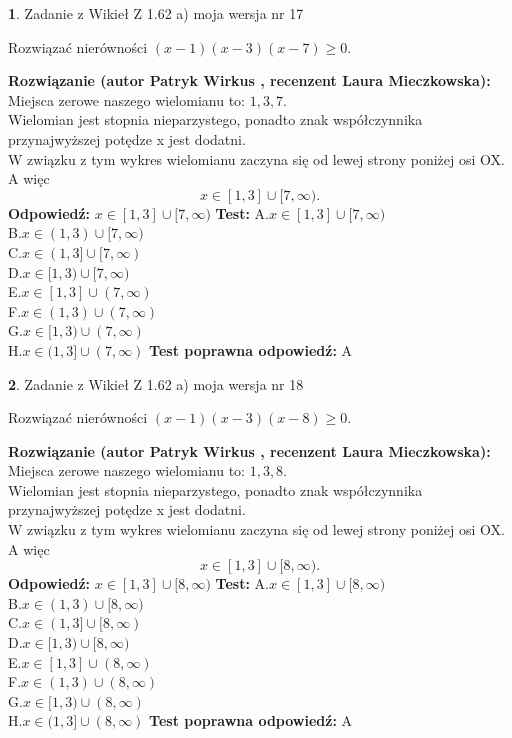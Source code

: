 \documentclass[12pt, a4paper]{article}
\theoremstyle{definition} %
\newtheorem{zad}{}
\newcommand{\zadStart}[1]{\begin{zad}#1\newline}
\newcommand{\zadStop}{\end{zad}}
\newcommand{\rozwStart}[2]{\noindent \textbf{Rozwiązanie (autor #1 , recenzent #2): }\newline}
\newcommand{\rozwStop}{\newline}
\newcommand{\odpStart}{\noindent \textbf{Odpowiedź:}\newline}
\newcommand{\odpStop}{\newline}
\newcommand{\testStart}{\noindent \textbf{Test:}\newline}
\newcommand{\testStop}{\newline}
\newcommand{\kluczStart}{\noindent \textbf{Test poprawna odpowiedź:}\newline}
\newcommand{\kluczStop}{\newline}
\begin{document}
\zadStart{Zadanie z Wikieł Z 1.62 a) moja wersja nr 17}

Rozwiązać nierówności $(x-1)(x-3)(x-7)\ge0$.
\zadStop
\rozwStart{Patryk Wirkus}{Laura Mieczkowska}
Miejsca zerowe naszego wielomianu to: $1, 3, 7$.\\
Wielomian jest stopnia nieparzystego, ponadto znak współczynnika przy\linebreak najwyższej potędze x jest dodatni.\\ W związku z tym wykres wielomianu zaczyna się od lewej strony poniżej osi OX. A więc $$x \in [1,3] \cup [7,\infty).$$
\rozwStop
\odpStart
$x \in [1,3] \cup [7,\infty)$
\odpStop
\testStart
A.$x \in [1,3] \cup [7,\infty)$\\
B.$x \in (1,3) \cup [7,\infty)$\\
C.$x \in (1,3] \cup [7,\infty)$\\
D.$x \in [1,3) \cup [7,\infty)$\\
E.$x \in [1,3] \cup (7,\infty)$\\
F.$x \in (1,3) \cup (7,\infty)$\\
G.$x \in [1,3) \cup (7,\infty)$\\
H.$x \in (1,3] \cup (7,\infty)$
\testStop
\kluczStart
A
\kluczStop



\zadStart{Zadanie z Wikieł Z 1.62 a) moja wersja nr 18}

Rozwiązać nierówności $(x-1)(x-3)(x-8)\ge0$.
\zadStop
\rozwStart{Patryk Wirkus}{Laura Mieczkowska}
Miejsca zerowe naszego wielomianu to: $1, 3, 8$.\\
Wielomian jest stopnia nieparzystego, ponadto znak współczynnika przy\linebreak najwyższej potędze x jest dodatni.\\ W związku z tym wykres wielomianu zaczyna się od lewej strony poniżej osi OX. A więc $$x \in [1,3] \cup [8,\infty).$$
\rozwStop
\odpStart
$x \in [1,3] \cup [8,\infty)$
\odpStop
\testStart
A.$x \in [1,3] \cup [8,\infty)$\\
B.$x \in (1,3) \cup [8,\infty)$\\
C.$x \in (1,3] \cup [8,\infty)$\\
D.$x \in [1,3) \cup [8,\infty)$\\
E.$x \in [1,3] \cup (8,\infty)$\\
F.$x \in (1,3) \cup (8,\infty)$\\
G.$x \in [1,3) \cup (8,\infty)$\\
H.$x \in (1,3] \cup (8,\infty)$
\testStop
\kluczStart
A
\kluczStop
\end{document}
